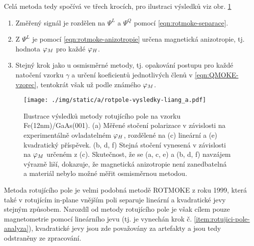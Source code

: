 Celá metoda tedy spočívá ve třech krocích, pro ilustraci výsledků viz obr. \ref{fig:metoda-rotujiciho-pole-vysledky}
\begin{enumerate}
    \item Změřený signál je rozdělen na $\Psi^L$ a $\Psi^Q$ pomocí \eqref{eqn:rotmoke-separace}.
    \item Z $\Psi^L$ je pomocí \eqref{eqn:rotmoke-anizotropie} určena magnetická anizotropie, tj. hodnota $\varphi_M$ pro každé $\varphi_H$.
    \item Stejný krok jako u osmisměrné metody, tj. opakování postupu pro každé natočení vzorku $\gamma$ a určení koeficientů jednotlivých členů v \eqref{eqn:QMOKE-vzorec}, tentokrát však už podle známého $\varphi_M$. \label{item:rotujici-pole-analyza}
\end{enumerate}

\begin{figure}[htbp]
    \centering
    \texttt{[image: ./img/static/a/rotpole-vysledky-liang\_a.pdf]}
    \caption{Ilustrace výsledků metody rotujícího pole na vzorku Fe(12nm)/GaAs(001).
    (a) Měřené stočení polarizace v závislosti na experimentálně ovladatelném $\varphi_H$, rozdělené na (c) lineární a (e) kvadratický příspěvek. (b, d, f) Stejná stočení vynesená v závislosti na $\varphi_M$ určeném z (c). 
    Skutečnost, že se (a, c, e) a (b, d, f) navzájem výrazně liší, dokazuje, že magnetická anizotropie není zanedbatelná a materiál nebylo možné měřit osmisměrnou metodou. \cite{liangSeparationLinearQuadratic2015}}
    \label{fig:metoda-rotujiciho-pole-vysledky}
\end{figure}

Metoda rotujícího pole je velmi podobná metodě ROTMOKE\cite{mattheisDeterminationAnisotropyField1999} z roku 1999, která také v rotujícím in-plane vnějším poli separuje lineární a kvadratické jevy stejným způsobem.
Narozdíl od metody rotujícího pole je však cílem pouze magnetometrie pomocí lineárního jevu (tj. je vynechán krok č. \ref{item:rotujici-pole-analyza}), kvadratické jevy jsou zde považovány za artefakty a jsou tedy odstraněny ze zpracování.
